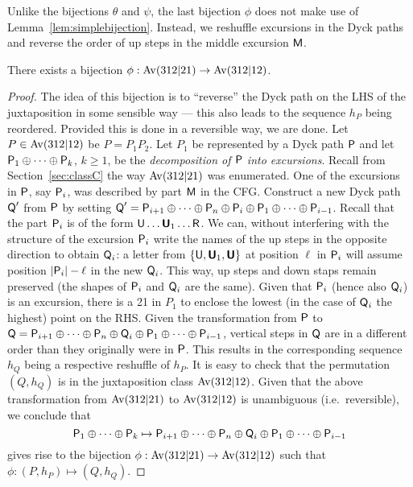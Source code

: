 \documentclass[12pt, a4paper, twoside]{report}
\begin{document}
Unlike the bijections $\theta$ and $\psi$, the last bijection $\phi$ does not make use of Lemma~\ref{lem:simplebijection}. Instead, we reshuffle excursions in the Dyck paths and reverse the order of up steps in the middle excursion $\mathsf{M}$. 

\begin{theorem}
\label{thm:phi}
There exists a bijection $\phi: \mathrm{Av}(312|21) \to \mathrm{Av}(312|12)$. 
\end{theorem}
\begin{proof}
The idea of this bijection is to ``reverse'' the Dyck path on the LHS of the juxtaposition in some sensible way --- this also leads to the sequence $h_P$ being reordered. Provided this is done in a reversible way, we are done. Let $P \in \mathrm{Av}(312|12)$ be $P = P_1P_2$. Let $P_1$ be represented by a Dyck path $\textsf{P}$ and let $\textsf{P}_1 \oplus \cdots \oplus \textsf{P}_k$, $k\geq 1$, be the \emph{decomposition of $\textsf{P}$ into excursions}. Recall from Section~\ref{sec:classC} the way $\mathrm{Av}(312|21)$ was enumerated. One of the excursions in $\textsf{P}$, say $\textsf{P}_i$, was described by part $\mathsf{M}$ in the CFG. Construct a new Dyck path $\textsf{Q}'$ from $\textsf{P}$ by setting $\textsf{Q}' = \textsf{P}_{i+1}\oplus \cdots \oplus \textsf{P}_{n} \oplus \textsf{P}_i \oplus \textsf{P}_1\oplus \cdots \oplus \textsf{P}_{i-1}$. Recall that the part $\textsf{P}_i$ is of the form $\mathsf{U}\ldots\textbf{\textsf{U}}_1\ldots \mathsf{R}$. We can, without interfering with the structure of the excursion $\textsf{P}_i$ write the names of the up steps in the opposite direction to obtain $\textsf{Q}_i$: a letter from $\{\mathsf{U}, \textbf{\textsf{U}}_1, \textbf{\textsf{U}}\}$ at position $\ell$ in $\textsf{P}_i$ will assume position $|\textsf{P}_i|-\ell$ in the new $\textsf{Q}_i$. This way, up steps and down staps remain preserved (the shapes of $\textsf{P}_i$ and $\textsf{Q}_i$ are the same). Given that $\textsf{P}_i$ (hence also $\textsf{Q}_i$) is an excursion, there is a 21 in $P_1$ to enclose the lowest (in the case of $\textsf{Q}_i$ the highest) point on the RHS. Given the transformation from $\textsf{P}$ to $\textsf{Q} = \textsf{P}_{i+1}\oplus \cdots \oplus \textsf{P}_{n} \oplus \textsf{Q}_i \oplus \textsf{P}_1\oplus \cdots \oplus \textsf{P}_{i-1}$, vertical steps in $\textsf{Q}$ are in a different order than they originally were in $\textsf{P}$. This results in the corresponding sequence $h_Q$ being a respective reshuffle of $h_P$. It is easy to check that the permutation $(Q,h_Q)$ is in the juxtaposition class $\mathrm{Av}(312|12)$. Given that the above transformation from $\mathrm{Av}(312|21)$ to $\mathrm{Av}(312|12)$ is unambiguous (i.e.~reversible), we conclude that 
$$\textsf{P}_1 \oplus \cdots \oplus \textsf{P}_k \mapsto \textsf{P}_{i+1}\oplus \cdots \oplus \textsf{P}_{n} \oplus \textsf{Q}_i \oplus \textsf{P}_1\oplus \cdots \oplus \textsf{P}_{i-1}$$
gives rise to the bijection $\phi: \mathrm{Av}(312|21) \to \mathrm{Av}(312|12)$ such that $\phi: (P,h_P) \mapsto (Q,h_Q)$.
\end{proof}
\end{document}
